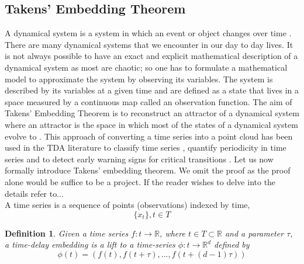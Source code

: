 \documentclass{article}
\newcommand{\be}{\begin{equation}}
\newcommand{\ee}{\end{equation}}
\newtheorem{definition}[theorem]{Definition}
\begin{document}
\subsection{Takens' Embedding Theorem}
A dynamical system is a system in which an event or object changes over time \cite{Kuznetsov2023}. There are many dynamical systems that we encounter in our day to day lives. It is not always possible to have an exact and explicit mathematical description of a dynamical system as most are chaotic; so one has to formulate a mathematical model to approximate the system by observing its variables. The system is described by its variables at a given time and are defined as a state that lives in a space measured by a continuous map called an observation function\cite{DEWOSKIN2010157}. The aim of Takens' Embedding Theorem is to reconstruct an attractor of a dynamical system where an attractor is the space in which most of the states of a dynamical system evolve to \cite{doi:10.1142/S0218127491000634}\cite{ravishanker2019topological}. This approach of converting a time series into a point cloud has been used in the TDA literature to classify time series \cite{Umeda2019TopologicalDA}, quantify periodicity in time series \cite{Perea_2014} and to detect early warning signs for critical transitions \cite{Gidea2017TopologicalDA}\cite{gidea2018topologicalcrypto}.
Let us now formally introduce Takens' embedding theorem. We omit the proof as the proof alone would be suffice to be a project. If the reader wishes to delve into the details refer to...\\

A time series is a sequence of points (observations) indexed by time,
\be
\{x_t\}, t\in T
\ee

\begin{definition} Given a time series $f: t \to \mathbb{R}$, where $t \in T \subset \mathbb{R}$ and a parameter $\tau$, a time-delay embedding is a lift to a time-series $\phi:t\to \mathbb{R}^d$ defined by 
\be
\phi(t) = (f(t), f(t+ \tau),..., f(t + (d-1)\tau))
\ee
\end{definition}
\end{document}
